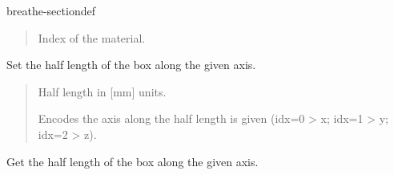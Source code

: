 \documentclass[letterpaper,10pt,english]{sphinxmanual}
\begin{document}
\begin{fulllineitems}
\begin{sphinxuseclass}{breathe-sectiondef}
\begin{fulllineitems}
\sphinxAtStartPar
\begin{quote}\begin{description}
\sphinxAtStartPar
Index of the material. 

\end{description}\end{quote}


\end{fulllineitems}


\begin{fulllineitems}
\label{\detokenize{Simulation/SimulationCodeDoc:_CPPv4N3Box13SetHalfLengthEdi}}
\pysigstartsignatures
\pysigstartmultiline
{}
\pysigstopmultiline
\pysigstopsignatures
\sphinxAtStartPar
Set the half length of the box along the given axis. 

\sphinxAtStartPar
\begin{quote}\begin{description}
\sphinxAtStartPar
\sphinxstylestrong{{[}in{]}} Half length in {[}mm{]} units. 

\sphinxAtStartPar
\sphinxstylestrong{{[}in{]}} Encodes the axis along the half length is given (idx=0 \textendash{}\textgreater{} x; idx=1 \textendash{}\textgreater{} y; idx=2 \textendash{}\textgreater{} z). 

\end{description}\end{quote}


\end{fulllineitems}


\begin{fulllineitems}
\label{\detokenize{Simulation/SimulationCodeDoc:_CPPv4NK3Box13GetHalfLengthEi}}
\pysigstartsignatures
\pysigstartmultiline
{}
\pysigstopmultiline
\pysigstopsignatures
\sphinxAtStartPar
Get the half length of the box along the given axis. 


\end{fulllineitems}
\end{sphinxuseclass}
\end{fulllineitems}
\end{document}
